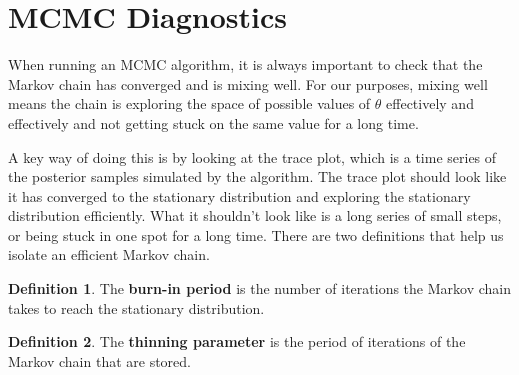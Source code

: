\documentclass[
]{book}
\theoremstyle{definition}
\newtheorem{definition}{Definition}[chapter]
\theoremstyle{definition}
\theoremstyle{definition}
\theoremstyle{definition}
\theoremstyle{remark}
\begin{document}
\hypertarget{mcmc-diagnostics}{%
\section{MCMC Diagnostics}\label{mcmc-diagnostics}}

When running an MCMC algorithm, it is always important to check that the Markov chain has converged and is mixing well. For our purposes, mixing well means the chain is exploring the space of possible values of \(\theta\) effectively and effectively and not getting stuck on the same value for a long time.

A key way of doing this is by looking at the trace plot, which is a time series of the posterior samples simulated by the algorithm. The trace plot should look like it has converged to the stationary distribution and exploring the stationary distribution efficiently. What it shouldn't look like is a long series of small steps, or being stuck in one spot for a long time. There are two definitions that help us isolate an efficient Markov chain.

\begin{definition}
The \textbf{burn-in period} is the number of iterations the Markov chain takes to reach the stationary distribution.
\end{definition}

\begin{definition}
The \textbf{thinning parameter} is the period of iterations of the Markov chain that are stored.
\end{definition}
\end{document}
